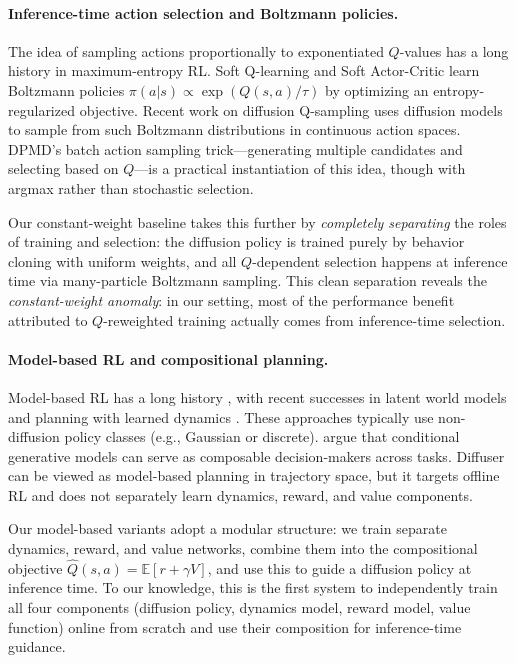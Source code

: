\documentclass{article}
\theoremstyle{plain}
\theoremstyle{definition}
\theoremstyle{remark}
\newcommand{\E}{\mathbb{E}}
\newcommand{\Q}{\hat{Q}}
\begin{document}
\paragraph{Inference-time action selection and Boltzmann policies.}
The idea of sampling actions proportionally to exponentiated $Q$-values has a long history in maximum-entropy RL.
Soft Q-learning \citep{haarnoja2017sql} and Soft Actor-Critic \citep{haarnoja2018sac} learn Boltzmann policies $\pi(a|s) \propto \exp(Q(s,a)/\tau)$ by optimizing an entropy-regularized objective.
Recent work on diffusion Q-sampling \citep{lu2024diffusionql} uses diffusion models to sample from such Boltzmann distributions in continuous action spaces.
DPMD's batch action sampling trick---generating multiple candidates and selecting based on $Q$---is a practical instantiation of this idea, though with argmax rather than stochastic selection.

Our constant-weight baseline takes this further by \emph{completely separating} the roles of training and selection: the diffusion policy is trained purely by behavior cloning with uniform weights, and all $Q$-dependent selection happens at inference time via many-particle Boltzmann sampling.
This clean separation reveals the \emph{constant-weight anomaly}: in our setting, most of the performance benefit attributed to $Q$-reweighted training actually comes from inference-time selection.

\paragraph{Model-based RL and compositional planning.}
Model-based RL has a long history \citep{sutton1990dyna}, with recent successes in latent world models \citep{hafner2020dreamer,hafner2023dreamerv3} and planning with learned dynamics \citep{schrittwieser2020muzero}.
These approaches typically use non-diffusion policy classes (e.g., Gaussian or discrete).
\citet{ajay2023conditional} argue that conditional generative models can serve as composable decision-makers across tasks.
Diffuser \citep{janner2022diffuser} can be viewed as model-based planning in trajectory space, but it targets offline RL and does not separately learn dynamics, reward, and value components.

Our model-based variants adopt a modular structure: we train separate dynamics, reward, and value networks, combine them into the compositional objective $\Q(s,a) = \E[r+\gamma V]$, and use this to guide a diffusion policy at inference time.
To our knowledge, this is the first system to independently train all four components (diffusion policy, dynamics model, reward model, value function) online from scratch and use their composition for inference-time guidance.
\end{document}
